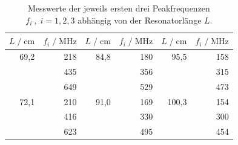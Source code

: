 \begin{table}[H]
    \centering
    \footnotesize
    \caption{Messwerte der jeweils ersten drei Peakfrequenzen $f_i\:, \; i = 1,2,3$ 
    abhängig von der Resonatorlänge $L$.}
    \label{tab:long}
    \begin{tabular}{r r | r r | r r}
    \toprule
    $L \;/\; \si{\centi\meter}$ & $f_i \;/\; \si{\mega\hertz}$ & 
    $L \;/\; \si{\centi\meter}$ & $f_i \;/\; \si{\mega\hertz}$ & 
    $L \;/\; \si{\centi\meter}$ & $f_i \;/\; \si{\mega\hertz}$ \\
    \midrule
         69,2 & 218 & 84,8 & 180 &  95,5 & 158 \\
              & 435 &      & 356 &       & 315 \\
              & 649 &      & 529 &       & 473 \\
         72,1 & 210 & 91,0 & 169 & 100,3 & 154 \\
              & 416 &      & 330 &       & 300 \\
              & 623 &      & 495 &       & 454 \\
        
    \bottomrule
    \end{tabular}
\end{table}